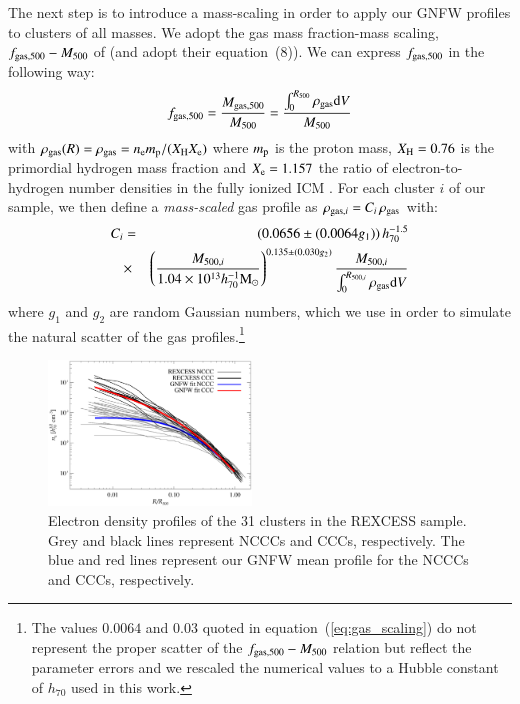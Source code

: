 \documentclass[useAMS,usenatbib]{mn2e}
\begin{document}
The next step is to introduce a mass-scaling in order to apply our GNFW profiles
to clusters of all masses. We adopt the gas mass fraction-mass scaling,
$f_{{\mathrm{gas}},500}-M_{500}$ of \cite{2009ApJ...693.1142S} (and adopt their
equation~(8)). We can express $f_{{\mathrm{gas}},500}$ in the following way:
\begin{equation}
f_{{\mathrm{gas}},500} = \frac{M_{{\mathrm{gas}},500}}{M_{500}}  = \frac{\int_{0}^{R_{500}} \rho_{{\mathrm{gas}}} {\mathrm{d}}V}{M_{500}}
\label{eq:m500}
\end{equation}
with $\rho_{{\mathrm{gas}}}(R) = \rho_{{\mathrm{gas}}} = n_{{\mathrm{e}}} m_{{\mathrm{p}}} / ( X_{{\mathrm{H}}}X_{{\mathrm{e}}} )$ where
$m_{{\mathrm{p}}}$ is the proton mass, $X_{{\mathrm{H}}} = 0.76$ is the primordial hydrogen
mass fraction and $X_{{\mathrm{e}}} = 1.157$ the ratio of electron-to-hydrogen number
densities in the fully ionized ICM \citep{1988xrec.book.....S}. For each cluster
$i$ of our sample, we then define a \emph{mass-scaled} gas profile as
$\rho_{{\mathrm{gas}},i}=C_{i} \,\rho_{{\mathrm{gas}}}$ with:
\begin{eqnarray}
C_{i}  & = &  (0.0656\pm(0.0064g_{1})) \, h_{70}^{-1.5}  \nonumber \\
 & \times & \left(\frac{M_{500,i}}{1.04 \times 10^{13} h_{70}^{-1} {\mathrm{M_{\odot}}}}\right)^{0.135\pm(0.030g_{2})} \frac{M_{500,i}}{\int_{0}^{R_{500,i}} \rho_{{\mathrm{gas}}} {\mathrm{d}}V}
\label{eq:gas_scaling}
\end{eqnarray}
where $g_{1}$ and $g_{2}$ are random Gaussian numbers, which we use in order to
simulate the natural scatter of the gas profiles.\footnote{The values
  $0.0064$ and $0.03$ quoted in equation~(\ref{eq:gas_scaling}) do not represent
  the proper scatter of the $f_{{\mathrm{gas}},500}-M_{500}$ relation but reflect the
  parameter errors and we rescaled the numerical values to a Hubble constant of
  $h_{70}$ used in this work.}

\begin{figure} 
\centering
\includegraphics[width=0.48\textwidth]{figures/gas_profiles.eps}
\caption{Electron density profiles of the 31 clusters in the REXCESS sample. Grey and black lines represent 
NCCCs and CCCs, respectively. The blue and red lines represent our GNFW mean profile for the NCCCs and CCCs, respectively.}
\label{fig:gas_profiles}
\end{figure}
\end{document}
